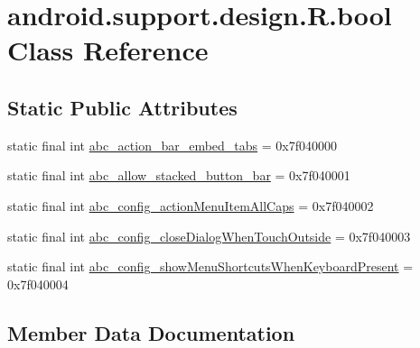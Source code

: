 \hypertarget{classandroid_1_1support_1_1design_1_1R_1_1bool}{}\section{android.\+support.\+design.\+R.\+bool Class Reference}
\label{classandroid_1_1support_1_1design_1_1R_1_1bool}
\subsection*{Static Public Attributes}
\begin{DoxyCompactItemize}
\item 
static final int \mbox{\hyperlink{classandroid_1_1support_1_1design_1_1R_1_1bool_a12b8abdc03b45f744e5cd022a682e181}{abc\+\_\+action\+\_\+bar\+\_\+embed\+\_\+tabs}} = 0x7f040000
\item 
static final int \mbox{\hyperlink{classandroid_1_1support_1_1design_1_1R_1_1bool_a2a8dac5f8c4ccac5b125012665593d60}{abc\+\_\+allow\+\_\+stacked\+\_\+button\+\_\+bar}} = 0x7f040001
\item 
static final int \mbox{\hyperlink{classandroid_1_1support_1_1design_1_1R_1_1bool_a4877609fc5e66b66c02146bb21a07830}{abc\+\_\+config\+\_\+action\+Menu\+Item\+All\+Caps}} = 0x7f040002
\item 
static final int \mbox{\hyperlink{classandroid_1_1support_1_1design_1_1R_1_1bool_a8dd305af540f7f30274ca9c611c2835d}{abc\+\_\+config\+\_\+close\+Dialog\+When\+Touch\+Outside}} = 0x7f040003
\item 
static final int \mbox{\hyperlink{classandroid_1_1support_1_1design_1_1R_1_1bool_a4042d6c58489ca07bb71f1b08b2e75bc}{abc\+\_\+config\+\_\+show\+Menu\+Shortcuts\+When\+Keyboard\+Present}} = 0x7f040004
\end{DoxyCompactItemize}


\subsection{Member Data Documentation}
\mbox{\label{classandroid_1_1support_1_1design_1_1R_1_1bool_a12b8abdc03b45f744e5cd022a682e181}} 

